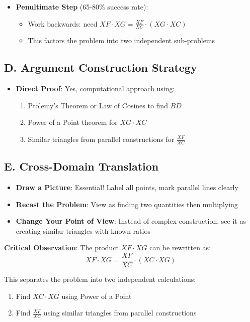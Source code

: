 \documentclass[]{article}
\begin{document}
\begin{strategicbox}
\begin{itemize}[leftmargin=*]
    \item \textbf{Penultimate Step} (65-80\% success rate):
    \begin{itemize}
        \item Work backwards: need $XF \cdot XG = \frac{XF}{XC} \cdot (XG \cdot XC)$
        \item This factors the problem into two independent sub-problems
    \end{itemize}
\end{itemize}

\subsection*{D. Argument Construction Strategy}
\begin{itemize}[leftmargin=*]
    \item \textbf{Direct Proof}: Yes, computational approach using:
    \begin{enumerate}
        \item Ptolemy's Theorem or Law of Cosines to find $BD$
        \item Power of a Point theorem for $XG \cdot XC$
        \item Similar triangles from parallel constructions for $\frac{XF}{XC}$
    \end{enumerate}
\end{itemize}

\subsection*{E. Cross-Domain Translation}
\begin{itemize}[leftmargin=*]
    \item \textbf{Draw a Picture}: Essential! Label all points, mark parallel lines clearly
    \item \textbf{Recast the Problem}: View as finding two quantities then multiplying
    \item \textbf{Change Your Point of View}: Instead of complex construction, see it as creating similar triangles with known ratios
\end{itemize}
\end{strategicbox}

\begin{keyinsightbox}
\textbf{Critical Observation}: The product $XF \cdot XG$ can be rewritten as:
\[XF \cdot XG = \frac{XF}{XC} \cdot (XC \cdot XG)\]

This separates the problem into two independent calculations:
\begin{enumerate}
    \item Find $XC \cdot XG$ using Power of a Point
    \item Find $\frac{XF}{XC}$ using similar triangles from parallel constructions
\end{enumerate}
\end{keyinsightbox}
\end{document}
